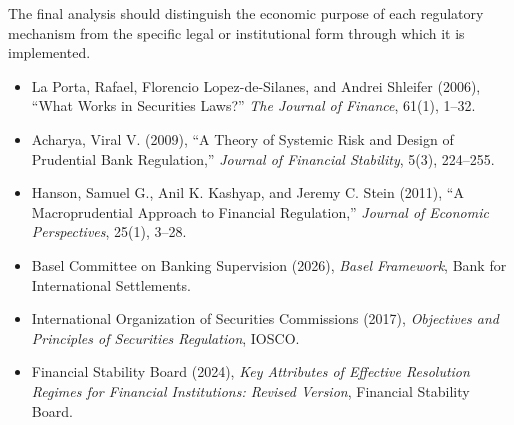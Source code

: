 The final analysis should distinguish the economic purpose of each regulatory mechanism from the specific legal or institutional form through which it is implemented.




\begin{itemize}

\item La Porta, Rafael, Florencio Lopez-de-Silanes, and Andrei Shleifer (2006),
``What Works in Securities Laws?''
\emph{The Journal of Finance}, 61(1), 1--32.

\item Acharya, Viral V. (2009),
``A Theory of Systemic Risk and Design of Prudential Bank Regulation,''
\emph{Journal of Financial Stability}, 5(3), 224--255.

\item Hanson, Samuel G., Anil K. Kashyap, and Jeremy C. Stein (2011),
``A Macroprudential Approach to Financial Regulation,''
\emph{Journal of Economic Perspectives}, 25(1), 3--28.

\item Basel Committee on Banking Supervision (2026),
\emph{Basel Framework},
Bank for International Settlements.

\item International Organization of Securities Commissions (2017),
\emph{Objectives and Principles of Securities Regulation},
IOSCO.

\item Financial Stability Board (2024),
\emph{Key Attributes of Effective Resolution Regimes for Financial Institutions: Revised Version},
Financial Stability Board.

\end{itemize}


